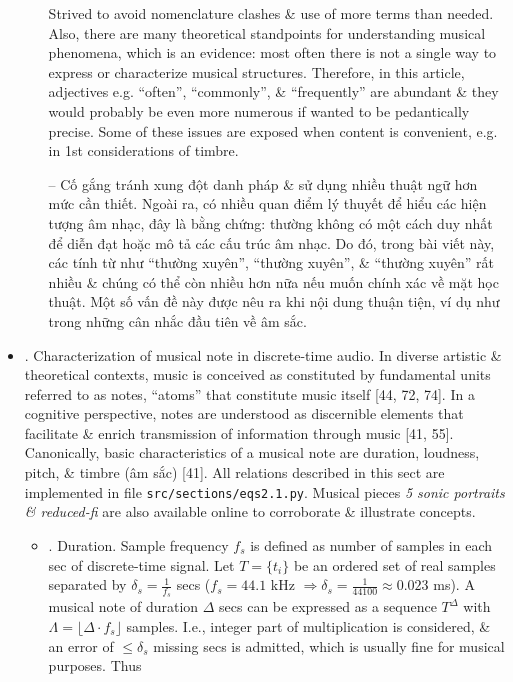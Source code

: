 \documentclass{article}
\begin{document}
\begin{itemize}
\begin{itemize}
\begin{itemize}
		\end{itemize}
		Strived to avoid nomenclature clashes \& use of more terms than needed. Also, there are many theoretical standpoints for understanding musical phenomena, which is an evidence: most often there is not a single way to express or characterize musical structures. Therefore, in this article, adjectives e.g. ``often'', ``commonly'', \& ``frequently'' are abundant \& they would probably be even more numerous if wanted to be pedantically precise. Some of these issues are exposed when content is convenient, e.g. in 1st considerations of timbre.
		
		-- Cố gắng tránh xung đột danh pháp \& sử dụng nhiều thuật ngữ hơn mức cần thiết. Ngoài ra, có nhiều quan điểm lý thuyết để hiểu các hiện tượng âm nhạc, đây là bằng chứng: thường không có một cách duy nhất để diễn đạt hoặc mô tả các cấu trúc âm nhạc. Do đó, trong bài viết này, các tính từ như ``thường xuyên'', ``thường xuyên'', \& ``thường xuyên'' rất nhiều \& chúng có thể còn nhiều hơn nữa nếu muốn chính xác về mặt học thuật. Một số vấn đề này được nêu ra khi nội dung thuận tiện, ví dụ như trong những cân nhắc đầu tiên về âm sắc.
	\end{itemize}	
	\item {. Characterization of musical note in discrete-time audio.} In diverse artistic \& theoretical contexts, music is conceived as constituted by fundamental units referred to as notes, ``atoms'' that constitute music itself [44, 72, 74]. In a cognitive perspective, notes are understood as discernible elements that facilitate \& enrich transmission of information through music [41, 55]. Canonically, basic characteristics of a musical note are duration, loudness, pitch, \& timbre (âm sắc) [41]. All relations described in this sect are implemented in file {\tt src/sections/eqs2.1.py}. Musical pieces {\it5 sonic portraits \& reduced-fi} are also available online to corroborate \& illustrate concepts.
	\begin{itemize}
		\item {. Duration.} Sample frequency $f_s$ is defined as number of samples in each sec of discrete-time signal. Let $T = \{t_i\}$ be an ordered set of real samples separated by $\delta_s = \frac{1}{f_s}$ secs ($f_s = 44.1$ kHz $\Rightarrow\delta_s = \frac{1}{44100}\approx0.023$ ms). A musical note of duration $\Delta$ secs can be expressed as a sequence $T^\Delta$ with $\Lambda = \lfloor\Delta\cdot f_s\rfloor$ samples. I.e., integer part of multiplication is considered, \& an error of $\le\delta_s$ missing secs is admitted, which is usually fine for musical purposes. Thus

\end{itemize}
\end{itemize}
\end{document}
